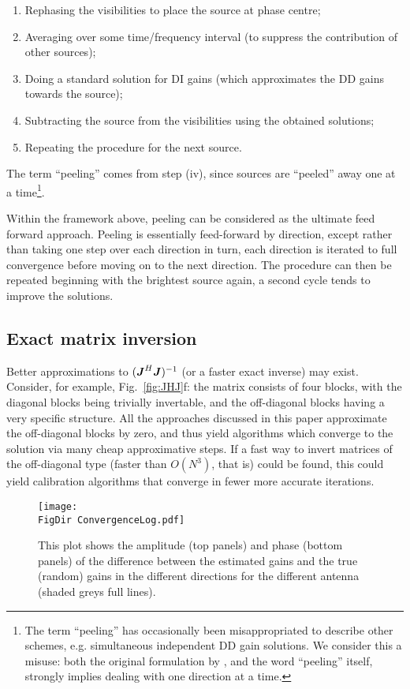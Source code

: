\documentclass[useAMS,usenatbib]{mn2e}
\newcommand{\mat}[1]{{\bmath{#1}}}
\newcommand{\JJ}{\mat{J}} %
\newcommand{\JHJ}{\JJ^H\JJ} %
\newcommand{\FigDir}{../Figures/}
\begin{document}
\begin{enumerate}
\item Rephasing the visibilities to place the source at phase centre;
\item Averaging over some time/frequency interval (to suppress the contribution of other sources);
\item Doing a standard solution for DI gains (which approximates the DD gains towards the source);
\item Subtracting the source from the visibilities using the obtained solutions;
\item Repeating the procedure for the next source.
\end{enumerate}

The term ``peeling'' comes from step (iv), since sources are ``peeled'' away one at a time\footnote{The term ``peeling'' has 
occasionally been misappropriated to describe other schemes, e.g. simultaneous independent DD gain solutions. We consider this a 
misuse: both the original formulation by \citet{JEN:peeling}, and the word ``peeling'' itself, strongly implies dealing with 
one direction at a time.}.

Within the framework above, peeling can be considered as the ultimate feed forward approach. Peeling is essentially feed-forward by direction, except rather than taking one step over each direction in turn, each direction is iterated to full convergence before moving on to the next direction. The procedure can then be repeated beginning with the brightest source again, a second cycle tends to improve the solutions. 

\subsection{Exact matrix inversion}

Better approximations to $(\JHJ)^{-1}$ (or a faster exact inverse) may exist. Consider, for example, Fig.~\ref{fig:JHJ}f: 
the matrix consists of four blocks, with the diagonal blocks being trivially invertable, and the off-diagonal blocks having a 
very specific structure. All the approaches discussed in this paper approximate the off-diagonal blocks by zero, and thus 
yield algorithms which converge to the solution via many cheap approximative steps. If a fast way to invert matrices of the 
off-diagonal type (faster than $O(N^3)$, that is) could be found, this could yield calibration algorithms that converge in fewer 
more accurate iterations.

\begin{figure*}
\begin{center}
\texttt{[image: \\FigDir ConvergenceLog.pdf]}
\caption{\label{fig:Convergence} This plot shows the amplitude (top
  panels) and
  phase (bottom panels) of the difference between
  the estimated gains and the true (random) gains in the different
  directions for the different antenna (shaded greys full lines).}
\end{center}
\end{figure*}
\end{document}
